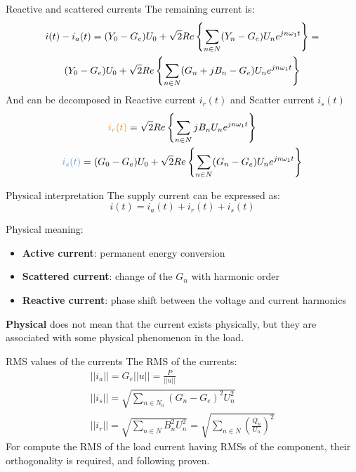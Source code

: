 \documentclass[aspectratio=169]{beamer}
\begin{document}
  \begin{frame}{Reactive and scattered currents}{\insertsection}
  The remaining current is:
  \begin{gather}
    i(t)-i_a(t) = (Y_0-G_e)U_0 + \sqrt{2}Re\left\{\sum_{n\in N}(Y_n-G_e)U_n e^{jn\omega_1t}\right\}=\notag \\
    (Y_0-G_e)U_0 + \sqrt{2}Re\left\{\sum_{n\in N}(G_n+jB_n-G_e)U_n e^{jn\omega_1t}\right\}
  \end{gather}
  And can be decomposed in \textcolor{NTNU_orange}{Reactive current} $i_r(t)$ and  \textcolor{NTNU_blue}{Scatter current} $i_s(t)$
  \begin{gather}
    \textcolor{NTNU_orange}{i_r(t)} = \sqrt{2} Re\left\{\sum_{n\in N}j B_n U_n e^{jn\omega_1t}\right\}\\
    \textcolor{NTNU_blue}{i_s(t)} = (G_0-G_e)U_0 + \sqrt{2}Re\left\{\sum_{n\in N}(G_n-G_e)U_n e^{jn\omega_1t}\right\}
  \end{gather}

  \end{frame}

  \begin{frame}{Physical interpretation}{\insertsection}
  The supply current can be expressed as:
    \begin{equation}
      i(t) = i_a(t) + i_r(t) + i_s(t)
    \end{equation}

    Physical meaning:
    \begin{itemize}
      \item \textbf{Active current}: permanent energy conversion
      \item \textbf{Scattered current}: change of the $G_n$ with harmonic order
      \item \textbf{Reactive current}: phase shift between the voltage and current harmonics
    \end{itemize}

    \textbf{\textcolor{NTNU_blue}{Physical}} does not mean that the current exists physically, but they are associated with some physical phenomenon in the load. 
  \end{frame}

  \begin{frame}{RMS values of the currents}{\insertsection}
  The RMS of the currents:
      \begin{gather}
            ||i_a||=G_e||u||=\frac{P}{||u||}\\
            ||i_s||=\sqrt{\sum_{n \in N_0}(G_n-G_e)^2U_n^2}\\
            ||i_r||=\sqrt{\sum_{n\in N}B_n^2U_n^2}=\sqrt{\sum_{n\in N}\left(\frac{Q_n}{U_n}\right)^2}
      \end{gather}
      For compute the RMS of the load current having RMSs of the component, their orthogonality is required, and following proven.
  \end{frame}
\end{document}

